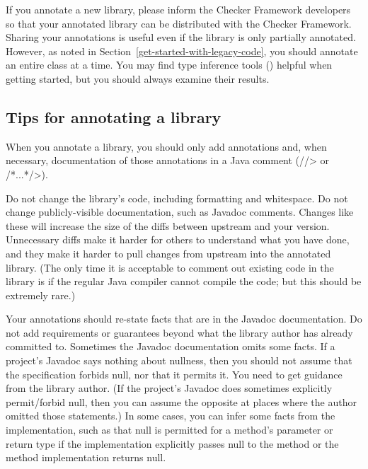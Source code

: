 If you annotate a new library, please inform the Checker Framework
developers so that your annotated library can be distributed with the
Checker Framework.
Sharing your annotations is useful even if the library is only partially
annotated.
However, as noted in Section~\ref{get-started-with-legacy-code}, you
should annotate an entire class at a time.
You may find type inference tools () helpful
when getting started, but you should always examine their results.


\subsection{Tips for annotating a library\label{annotating-tips}}

When you annotate a library, you should only add annotations and, when
necessary, documentation of those annotations in a Java comment (\<//>
or \</*...*/>).

Do not change the library's code, including formatting and whitespace.
Do not change publicly-visible documentation, such as Javadoc comments.
Changes like these will increase the size of the diffs
between upstream and your version.  Unnecessary diffs make it harder for
others to understand what you have done, and they make it harder to pull
changes from upstream into the annotated library.
(The only time it is acceptable to comment out existing code in the library
is if the regular Java compiler cannot compile the code; but this should be
extremely rare.)

Your annotations should re-state facts that are in the Javadoc
documentation.  Do not add requirements or guarantees beyond what the
library author has already committed to.  Sometimes the Javadoc
documentation omits some facts.  If a project's Javadoc says nothing about
nullness, then you should not assume that the specification forbids null,
nor that it permits it.  You need to get guidance from the library author.
(If the project's Javadoc does sometimes explicitly permit/forbid null,
then you can assume the opposite at places where the author omitted those
statements.)  In some cases, you can infer some facts from the
implementation, such as that null is permitted for a method's parameter or
return type if the implementation explicitly passes null to the method or
the method implementation returns null.

